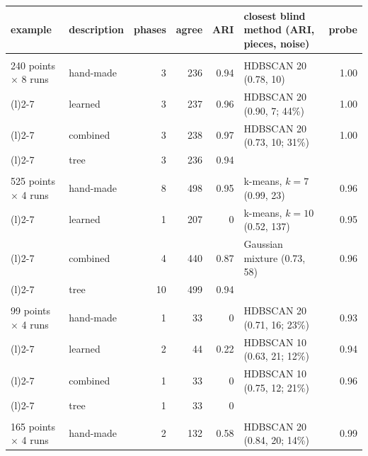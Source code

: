 \documentclass[11pt,a4paper]{article}
\begin{document}
\begin{table}[H]
\centering\small
\setlength{\tabcolsep}{4.5pt}
\begin{tabular}{@{}>{\raggedright}p{2.5cm}lrrr>{\raggedright}p{5.0cm}r@{}}
\toprule
example & description & phases & agree & ARI & closest blind method (ARI, pieces, noise) & probe \\
\midrule
\multirow{4}{=}{\textbf{Swift-Hohenberg}\\ 240 points $\times$ 8 runs} & hand-made & 3 & 236 & 0.94 & HDBSCAN 20 (0.78, 10) & 1.00 \\
\arrayrulecolor{black!30}\cmidrule[0.3pt](l){2-7}\arrayrulecolor{black}
 & learned & 3 & 237 & 0.96 & HDBSCAN 20 (0.90, 7; 44\%) & 1.00 \\
\arrayrulecolor{black!30}\cmidrule[0.3pt](l){2-7}\arrayrulecolor{black}
 & combined & 3 & 238 & 0.97 & HDBSCAN 20 (0.73, 10; 31\%) & 1.00 \\
\arrayrulecolor{black!30}\cmidrule[0.3pt](l){2-7}\arrayrulecolor{black}
 & tree & 3 & 236 & 0.94 &  &  \\
\midrule
\multirow{4}{=}{\textbf{Gray-Scott}\\ 525 points $\times$ 4 runs} & hand-made & 8 & 498 & 0.95 & k-means, $k=7$ (0.99, 23) & 0.96 \\
\arrayrulecolor{black!30}\cmidrule[0.3pt](l){2-7}\arrayrulecolor{black}
 & learned & 1 & 207 & 0 & k-means, $k=10$ (0.52, 137) & 0.95 \\
\arrayrulecolor{black!30}\cmidrule[0.3pt](l){2-7}\arrayrulecolor{black}
 & combined & 4 & 440 & 0.87 & Gaussian mixture (0.73, 58) & 0.96 \\
\arrayrulecolor{black!30}\cmidrule[0.3pt](l){2-7}\arrayrulecolor{black}
 & tree & 10 & 499 & 0.94 &  &  \\
\midrule
\multirow{4}{=}{\textbf{FitzHugh-Nagumo}\\ 99 points $\times$ 4 runs} & hand-made & 1 & 33 & 0 & HDBSCAN 20 (0.71, 16; 23\%) & 0.93 \\
\arrayrulecolor{black!30}\cmidrule[0.3pt](l){2-7}\arrayrulecolor{black}
 & learned & 2 & 44 & 0.22 & HDBSCAN 10 (0.63, 21; 12\%) & 0.94 \\
\arrayrulecolor{black!30}\cmidrule[0.3pt](l){2-7}\arrayrulecolor{black}
 & combined & 1 & 33 & 0 & HDBSCAN 10 (0.75, 12; 21\%) & 0.96 \\
\arrayrulecolor{black!30}\cmidrule[0.3pt](l){2-7}\arrayrulecolor{black}
 & tree & 1 & 33 & 0 &  &  \\
\midrule
\multirow{4}{=}{\textbf{Barkley}\\ 165 points $\times$ 4 runs} & hand-made & 2 & 132 & 0.58 & HDBSCAN 20 (0.84, 20; 14\%) & 0.99 \\

\end{tabular}
\end{table}
\end{document}
